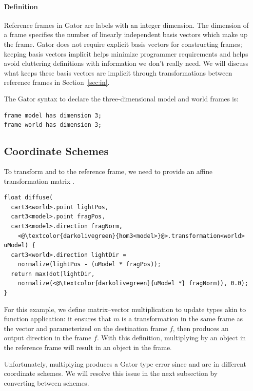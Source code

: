 \paragraph{Definition}
Reference frames in Gator are labels with an integer dimension.  The dimension of a frame specifies the number of linearly independent basis vectors which make up the frame. Gator does not require explicit basis vectors for constructing frames; keeping basis vectors implicit helps minimize programmer requirements and helps avoid cluttering definitions with information we don't really need.
We will discuss what keeps these basis vectors are implicit through transformations between reference frames in Section~\ref{sec:in}.

The Gator syntax to declare the three-dimensional model and world frames is:
%
\begin{lstlisting}
frame model has dimension 3;
frame world has dimension 3;
\end{lstlisting}
%
\subsection{Coordinate Schemes}
\label{subsec:schemes}

To transform  and  to the  reference frame, we need to provide an affine transformation matrix .
%
\begin{lstlisting}
float diffuse(
  cart3<world>.point lightPos, 
  cart3<model>.point fragPos, 
  cart3<model>.direction fragNorm,
    <@\textcolor{darkolivegreen}{hom3<model>}@>.transformation<world> uModel) {
  cart3<world>.direction lightDir = 
    normalize(lightPos - (uModel * fragPos));
  return max(dot(lightDir, 
    normalize(<@\textcolor{darkolivegreen}{uModel *} fragNorm)), 0.0);
}
\end{lstlisting}
%
For this example, we define matrix--vector multiplication  to update types akin to function application: it ensures that $m$ is a transformation in the same frame as the vector and parameterized on the destination frame $f$, then produces an output direction in the frame $f$.
With this definition, multiplying  by an object in the  reference frame will result in an object in the  frame.

Unfortunately, multiplying  produces a Gator type error since  and  are in different coordinate schemes.
We will resolve this issue in the next subsection by converting between schemes.

